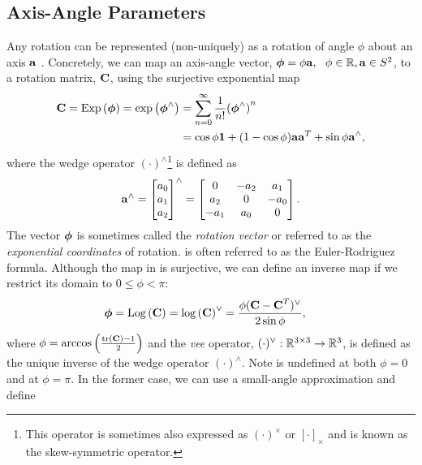 
\subsection{Axis-Angle Parameters}

Any rotation can be represented (non-uniquely) as a rotation of angle $\phi$ about an axis $\boldsymbol{\mathbf{a}}$ \citep{Hartley2013-rc}. Concretely, we can map an axis-angle vector, $\boldsymbol{\mathbf{\phi}} = \phi \boldsymbol{\mathbf{a}}, ~~ \phi \in \mathbb{R}{}, \boldsymbol{\mathbf{a}} \in S^2$, to a rotation matrix, $\boldsymbol{\mathbf{C}}$, using the surjective exponential map 
\begin{align}
\label{eq:so3_exp}
\boldsymbol{\mathbf{C}} = \mathrm{Exp}\left({\boldsymbol{\mathbf{\phi}}}\right) = \mathrm{exp}\left({\boldsymbol{\mathbf{\phi}}}^{\wedge}\right) &= \sum_{n=0}^{\infty}  \frac{1}{n!} {(\boldsymbol{\mathbf{\phi}}^\wedge)}^n\\
\label{eq:euler_rodriguez}
&= \cos{\phi} \boldsymbol{\mathbf{1}} + (1 - \cos{\phi}) \boldsymbol{\mathbf{a}}\boldsymbol{\mathbf{a}}^T + \sin{\phi} \boldsymbol{\mathbf{a}}^\wedge,
\end{align}
where the wedge operator $(\cdot)^\wedge$\footnote{This operator is sometimes also expressed as $(\cdot)^\times$ or $[\cdot]_\times$ and is known as the skew-symmetric operator.} is defined as
\begin{equation}
\boldsymbol{\mathbf{a}}^\wedge = \begin{bmatrix} a_0 \\ a_1 \\ a_2 \end{bmatrix}^\wedge = \begin{bmatrix} 0 & -a_2 & a_1 \\ a_2 & 0 & -a_0 \\ -a_1 & a_0 & 0 \end{bmatrix}.	
\end{equation}
The vector $\boldsymbol{\mathbf{\phi}}$ is sometimes called the \textit{rotation vector} \citep{Barfoot2017-ri} or referred to as the \textit{exponential coordinates} \citep{Gallego2015} of rotation.  is often referred to as the Euler-Rodriguez formula. Although the map in  is surjective, we can define an inverse map if we restrict its domain to $0 \leq \phi < \pi$:
\begin{align}
\label{eq:so3_log}
\boldsymbol{\mathbf{\phi}} =  \mathrm{Log}\left({\boldsymbol{\mathbf{C}}}\right) = \mathrm{log}\left({\boldsymbol{\mathbf{C}}}\right)^{\vee} &= \frac{\phi (\boldsymbol{\mathbf{C}} - \boldsymbol{\mathbf{C}}^T)^\vee}{2 \sin{\phi}}, 
\end{align}
where $\phi = \arccos{\left(\frac{ \mathrm{tr}\left(  \boldsymbol{\mathbf{C}}  \right)  - 1}{2}\right)}$ and the \textit{vee} operator, $(\cdot)^\vee : \mathbb{R}{}^{3 \times 3} \rightarrow \mathbb{R}{}^3$, is defined as the unique inverse of the wedge operator $(\cdot)^\wedge$. Note  is undefined at both $\phi = 0$ and at $\phi = \pi$. In the former case, we can use a small-angle approximation and define

